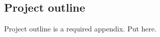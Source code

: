     
    
    \begin{uomappendix} 
        \section{Project outline}
    
            \begin{temp}
                Project outline is a required appendix. Put here.
            \end{temp}
            
            
            
            

\end{uomappendix}
